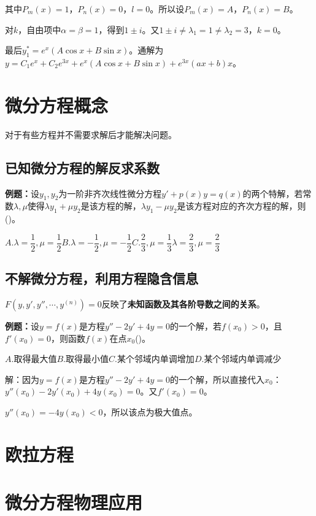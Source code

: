 \documentclass[UTF8, 12pt]{ctexart}
\begin{document}
其中$P_m(x)=1$，$P_n(x)=0$，$l=0$。所以设$P_m(x)=A$，$P_n(x)=B$。

对$k$，自由项中$\alpha=\beta=1$，得到$1\pm i$。又$1\pm i\neq\lambda_1=1\neq\lambda_2=3$，$k=0$。

最后$y_1^*=e^x(A\cos x+B\sin x)$。通解为$y=C_1e^x+C_2e^{3x}+e^x(A\cos x+B\sin x)+e^{3x}(ax+b)x$。

\section{微分方程概念}

对于有些方程并不需要求解后才能解决问题。

\subsection{已知微分方程的解反求系数}

\textbf{例题：}设$y_1,y_2$为一阶非齐次线性微分方程$y'+p(x)y=q(x)$的两个特解，若常数$\lambda,\mu$使得$\lambda y_1+\mu y_2$是该方程的解，$\lambda y_1-\mu y_2$是该方程对应的齐次方程的解，则()。

$A.\lambda=\dfrac{1}{2},\mu=\dfrac{1}{2}$\qquad$B.\lambda=-\dfrac{1}{2},\mu=-\dfrac{1}{2}$\qquad$C.\dfrac{2}{3},\mu=\dfrac{1}{3}$\qquad$\lambda=\dfrac{2}{3},\mu=\dfrac{2}{3}$

\subsection{不解微分方程，利用方程隐含信息}

$F(y,y',y'',\cdots,y^{(n)})=0$反映了\textbf{未知函数及其各阶导数之间的关系}。

\textbf{例题：}设$y=f(x)$是方程$y''-2y'+4y=0$的一个解，若$f(x_0)>0$，且$f'(x_0)=0$，则函数$f(x)$在点$x_0$()。

$A.$取得最大值\qquad$B.$取得最小值\qquad$C.$某个邻域内单调增加\qquad$D.$某个邻域内单调减少

解：因为$y=f(x)$是方程$y''-2y'+4y=0$的一个解，所以直接代入$x_0$：$y''(x_0)-2y'(x_0)+4y(x_0)=0$。又$f'(x_0)=0$。

$y''(x_0)=-4y(x_0)<0$，所以该点为极大值点。

\section{欧拉方程}

\section{微分方程物理应用}
\end{document}
